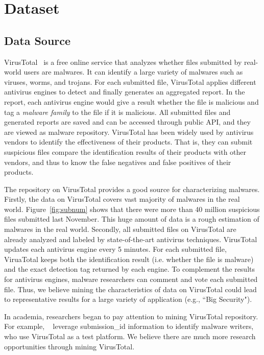 \section{Dataset}
\label{sec:meth}
\subsection{Data Source}
VirusTotal~\cite{virustotal} is a free online service that analyzes whether files submitted by real-world users are malwares. It can identify  a large variety of malwares such as viruses, worms, and trojans. For each submitted file, VirusTotal applies different antivirus engines to detect and finally generates an aggregated report. In the report, each antivirus engine would give a result whether the file is malicious and tag a \emph{malware family} to the file if it is malicious.  All submitted files and generated reports are saved and can be accessed through public API, and they are viewed as malware repository. VirusTotal has been widely used by antivirus vendors to identify the effectiveness of their products. That is, they can submit suspicious files compare the identification results of their products with other vendors, and thus to know the false negatives and false positives of their products.


The repository on VirusTotal provides a good source for characterizing malwares. Firstly, the data on VirusTotal covers vast majority of malwares in the real world.
Figure~\ref{fig:subnum} shows that there were more than 40 million suspicious files submitted last November. 
This huge amount of data is a rough estimation of malwares in the real world. 
Secondly, all submitted files on VirusTotal are already analyzed and labeled by state-of-the-art antivirus techniques. VirusTotal updates each antivirus engine every 5 minutes. For each submitted file, ViruaTotal keeps both the identification result (i.e. whether the file is malware) and the exact detection tag returned by each engine. To complement the results for antivirus engines, malware researchers can comment and vote each submitted file. Thus, we believe mining the characteristics of data on VirusTotal could lead to representative results for a large variety of application (e.g., ``Big Security"). 

In academia, researchers began to pay attention to mining VirusTotal repository. 
For example, ~\citet{neeles} leverage submission\_id information to identify malware writers, 
who use VirusTotal as a test platform. 
We believe there are much more research opportunities through mining VirusTotal. 

